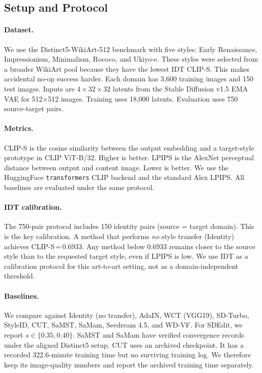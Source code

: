 \documentclass[letterpaper]{article}
\begin{document}
\subsection{Setup and Protocol}

\paragraph{Dataset.}
We use the Distinct5-WikiArt-512 benchmark with five styles: Early Renaissance, Impressionism, Minimalism, Rococo, and Ukiyo-e.
These styles were selected from a broader WikiArt pool because they have the lowest IDT CLIP-S.
This makes accidental no-op success harder.
Each domain has 3{,}600 training images and 150 test images.
Inputs are $4{\times}32{\times}32$ latents from the Stable Diffusion v1.5 EMA VAE for 512$\times$512 images.
Training uses 18{,}000 latents.
Evaluation uses 750 source-target pairs.

\paragraph{Metrics.}
CLIP-S is the cosine similarity between the output embedding and a target-style prototype in CLIP ViT-B/32.
Higher is better.
LPIPS is the AlexNet perceptual distance between output and content image.
Lower is better.
We use the HuggingFace \texttt{transformers} CLIP backend and the standard Alex LPIPS.
All baselines are evaluated under the same protocol.

\paragraph{IDT calibration.}
The 750-pair protocol includes 150 identity pairs (source = target domain).
This is the key calibration.
A method that performs \emph{no} style transfer (Identity) achieves CLIP-S\,=\,0.6933.
Any method below 0.6933 remains closer to the source style than to the requested target style, even if LPIPS is low.
We use IDT as a calibration protocol for this art-to-art setting, not as a domain-independent threshold.

\paragraph{Baselines.}
We compare against Identity (no transfer), AdaIN, WCT (VGG19), SD-Turbo, StyleID, CUT, SaMST, SaMam, Seedream 4.5, and WD-VF.
For SDEdit, we report $s{\in}\{0.35, 0.40\}$.
SaMST and SaMam have verified convergence records under the aligned Distinct5 setup.
CUT uses an archived checkpoint.
It has a recorded 322.6-minute training time but no surviving training log.
We therefore keep its image-quality numbers and report the archived training time separately.
\end{document}
